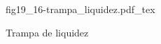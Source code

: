 \begin{figure}[h]
\centering
\def\svgwidth{0.5\textwidth}
{fig19_16-trampa_liquidez.pdf_tex}
\caption{Trampa de liquidez}
\label{fig19_16-trampa_liquidez}
\end{figure}
